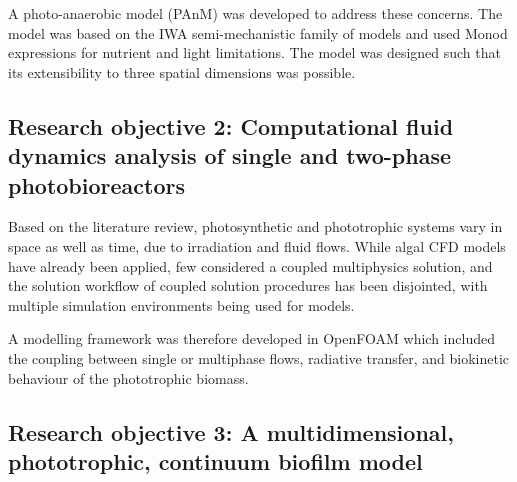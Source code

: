 A photo-anaerobic model (PAnM) was developed to address these concerns. The model was based on the IWA semi-mechanistic family of models and used Monod expressions for nutrient and light limitations. The model was designed such that its extensibility to three spatial dimensions was possible. 

\subsection{Research objective 2: Computational fluid dynamics analysis of single and two-phase photobioreactors}
Based on the literature review, photosynthetic and phototrophic systems vary in space as well as time, due to irradiation and fluid flows. While algal CFD models have already been applied, few considered a coupled multiphysics solution, and the solution workflow of coupled solution procedures has been disjointed, with multiple simulation environments being used for models. 

A modelling framework was therefore developed in OpenFOAM which included the coupling between single or multiphase flows, radiative transfer, and biokinetic behaviour of the phototrophic biomass.

\subsection{Research objective 3: A multidimensional, phototrophic, continuum biofilm model}






